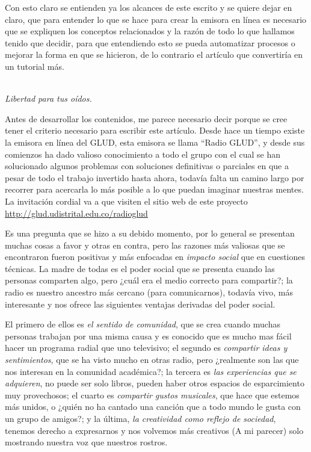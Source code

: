 \begin{multicols}{2}
Con esto claro se entienden ya los alcances de este escrito y se quiere dejar en claro, que para entender lo que se hace para crear la emisora en línea es necesario que se expliquen los conceptos relacionados y la razón de todo lo que hallamos tenido que decidir, para que entendiendo esto se pueda automatizar procesos o mejorar la forma en que se hicieron, de lo contrario el artículo que convertiría en un tutorial más.

\begin{entradilla} %
{\em {\color{introcolor}{Radio GLUD}} \\ Libertad para tus oídos.}
\end{entradilla}

Antes de desarrollar los contenidos, me parece necesario decir porque se cree tener el criterio necesario para escribir este artículo. Desde hace un tiempo existe la emisora en línea del GLUD, esta emisora se llama ``Radio GLUD'', y desde sus comienzos ha dado valioso conocimiento a todo el grupo con el cual se han solucionado algunos problemas con soluciones definitivas o parciales en que a pesar de todo el trabajo invertido hasta ahora, todavía falta un camino largo por recorrer para acercarla lo más posible a lo que puedan imaginar nuestras mentes.
La invitación cordial va a que visiten el sitio web de este proyecto \url{http://glud.udistrital.edu.co/radioglud}


Es una pregunta que se hizo a su debido momento, por lo general se presentan muchas cosas a favor y otras en contra, pero las razones más valiosas que se encontraron fueron positivas y más enfocadas en {\em impacto social} que en cuestiones técnicas. La madre de todas es el poder social que se presenta cuando las personas comparten algo, pero ¿cuál era el medio correcto para compartir?; la radio es nuestro ancestro más cercano (para comunicarnos), todavía vivo, más interesante y nos ofrece las siguientes ventajas derivadas del poder social.

El primero de ellos es {\em el sentido de comunidad}, que se crea cuando muchas personas trabajan por una misma causa y es conocido que es mucho mas fácil hacer un programa radial que uno televisivo; el segundo es {\em compartir ideas y sentimientos}, que se ha visto mucho en otras radio, pero ¿realmente son las que nos interesan en la comunidad académica?; la tercera es {\em las experiencias que se adquieren}, no puede ser solo libros, pueden haber otros espacios de esparcimiento muy provechosos; el cuarto es {\em compartir gustos musicales}, que hace que estemos más unidos, o ¿quién no ha cantado una canción que a todo mundo le gusta con un grupo de amigos?; y la última, {\em la creatividad como reflejo de sociedad}, tenemos derecho a expresarnos y nos volvemos más creativos (A mi parecer) solo mostrando nuestra voz que nuestros rostros.


\end{multicols}

